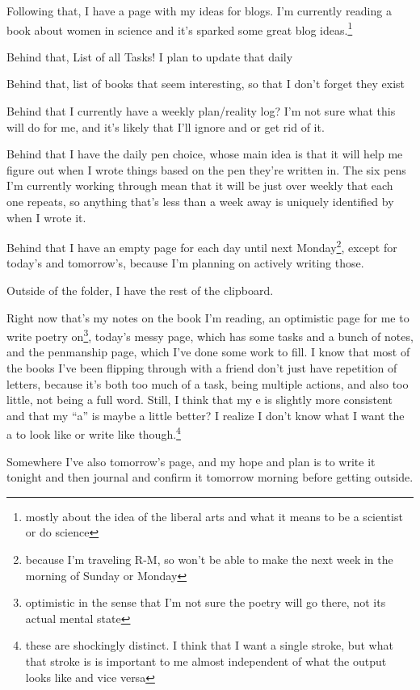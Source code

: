 \documentclass[12pt]{article}
\newcommand{\say}[1]{``#1''}
\renewcommand{\,}{\textsuperscript{,}}
\begin{document}
Following that, I have a page with my ideas for blogs.  
I'm currently reading a book about women in science and it's sparked some great blog ideas.\footnote{mostly about the idea of the liberal arts and what it means to be a scientist or do science}

Behind that, List of all Tasks!  
I plan to update that daily

Behind that, list of books that seem interesting, so that I don't forget they exist

Behind that I currently have a weekly plan/reality log?  
I'm not sure what this will do for me, and it's likely that I'll ignore and or get rid of it.

Behind that I have the daily pen choice, whose main idea is that it will help me figure out when I wrote things based on the pen they're written in.  
The six pens I'm currently working through mean that it will be just over weekly that each one repeats, so anything that's less than a week away is uniquely identified by when I wrote it.

Behind that I have an empty page for each day until next Monday\footnote{because I'm traveling R-M, so won't be able to make the next week in the morning of Sunday or Monday}, except for today's and tomorrow's, because I'm planning on actively writing those.

Outside of the folder, I have the rest of the clipboard.

Right now that's my notes on the book I'm reading, an optimistic page for me to write poetry on\footnote{optimistic in the sense that I'm not sure the poetry will go there, not its actual mental state}, today's messy page, which has some tasks and a bunch of notes, and the penmanship page, which I've done some work to fill.  
I know that most of the books I've been flipping through with a friend don't just have repetition of letters, because it's both too much of a task, being multiple actions, and also too little, not being a full word.  
Still, I think that my e is slightly more consistent and that my \say{a} is maybe a little better?  
I realize I don't know what I want the a to look like or write like though.\footnote{these are shockingly distinct. I think that I want a single stroke, but what that stroke is is important to me almost independent of what the output looks like and vice versa}

Somewhere I've also tomorrow's page, and my hope and plan is to write it tonight and then journal and confirm it tomorrow morning before getting outside.
\end{document}
